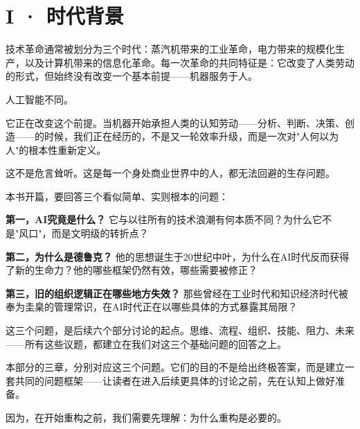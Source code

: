 \part{I · 时代背景}



技术革命通常被划分为三个时代：蒸汽机带来的工业革命，电力带来的规模化生产，以及计算机带来的信息化革命。每一次革命的共同特征是：它改变了人类劳动的形式，但始终没有改变一个基本前提——机器服务于人。

人工智能不同。

它正在改变这个前提。当机器开始承担人类的认知劳动——分析、判断、决策、创造——的时候，我们正在经历的，不是又一轮效率升级，而是一次对"人何以为人"的根本性重新定义。

这不是危言耸听。这是每一个身处商业世界中的人，都无法回避的生存问题。

本书开篇，要回答三个看似简单、实则根本的问题：

\textbf{第一，AI究竟是什么？} 它与以往所有的技术浪潮有何本质不同？为什么它不是"风口"，而是文明级的转折点？

\textbf{第二，为什么是德鲁克？} 他的思想诞生于20世纪中叶，为什么在AI时代反而获得了新的生命力？他的哪些框架仍然有效，哪些需要被修正？

\textbf{第三，旧的组织逻辑正在哪些地方失效？} 那些曾经在工业时代和知识经济时代被奉为圭臬的管理常识，在AI时代正在以哪些具体的方式暴露其局限？

这三个问题，是后续六个部分讨论的起点。思维、流程、组织、技能、阻力、未来——所有这些议题，都建立在我们对这三个基础问题的回答之上。

本部分的三章，分别对应这三个问题。它们的目的不是给出终极答案，而是建立一套共同的问题框架——让读者在进入后续更具体的讨论之前，先在认知上做好准备。

因为，在开始重构之前，我们需要先理解：为什么重构是必要的。
